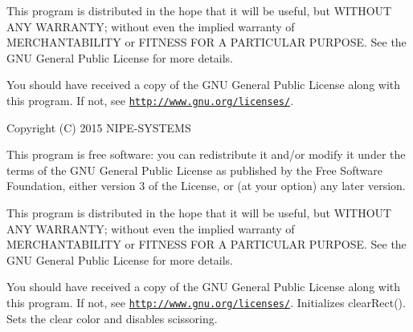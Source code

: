This program is distributed in the hope that it will be useful, but W\+I\+T\+H\+O\+U\+T A\+N\+Y W\+A\+R\+R\+A\+N\+T\+Y; without even the implied warranty of M\+E\+R\+C\+H\+A\+N\+T\+A\+B\+I\+L\+I\+T\+Y or F\+I\+T\+N\+E\+S\+S F\+O\+R A P\+A\+R\+T\+I\+C\+U\+L\+A\+R P\+U\+R\+P\+O\+S\+E. See the G\+N\+U General Public License for more details.

You should have received a copy of the G\+N\+U General Public License along with this program. If not, see \href{http://www.gnu.org/licenses/}{\tt http\+://www.\+gnu.\+org/licenses/}.

Copyright (C) 2015 N\+I\+P\+E-\/\+S\+Y\+S\+T\+E\+M\+S

This program is free software\+: you can redistribute it and/or modify it under the terms of the G\+N\+U General Public License as published by the Free Software Foundation, either version 3 of the License, or (at your option) any later version.

This program is distributed in the hope that it will be useful, but W\+I\+T\+H\+O\+U\+T A\+N\+Y W\+A\+R\+R\+A\+N\+T\+Y; without even the implied warranty of M\+E\+R\+C\+H\+A\+N\+T\+A\+B\+I\+L\+I\+T\+Y or F\+I\+T\+N\+E\+S\+S F\+O\+R A P\+A\+R\+T\+I\+C\+U\+L\+A\+R P\+U\+R\+P\+O\+S\+E. See the G\+N\+U General Public License for more details.

You should have received a copy of the G\+N\+U General Public License along with this program. If not, see \href{http://www.gnu.org/licenses/}{\tt http\+://www.\+gnu.\+org/licenses/}. Initializes clear\+Rect(). Sets the clear color and disables scissoring. 